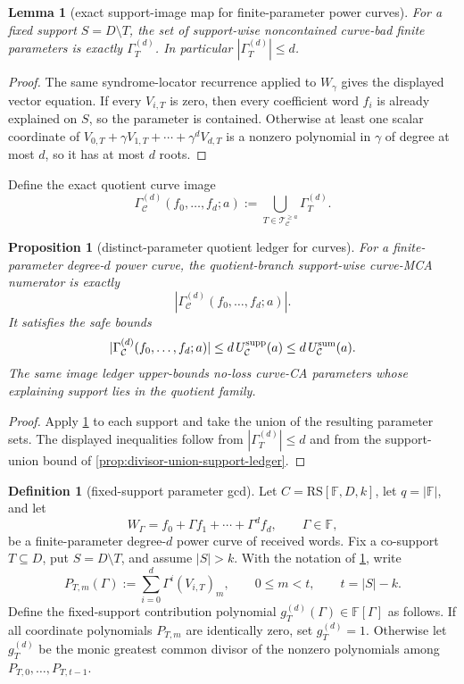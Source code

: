 \documentclass[11pt]{article}
\newtheorem{lemma}[theorem]{Lemma}
\newtheorem{proposition}[theorem]{Proposition}
\theoremstyle{definition}
\newtheorem{definition}[theorem]{Definition}
\theoremstyle{remark}
\newcommand{\F}{\mathbb{F}}
\newcommand{\RS}{\mathrm{RS}}
\begin{document}
\begin{lemma}[exact support-image map for finite-parameter power curves]
\label{lem:exact-curve-image-map}
For a fixed support $S=D\setminus T$, the set of support-wise noncontained
curve-bad finite parameters is exactly $\Gamma_T^{(d)}$.  In particular
$|\Gamma_T^{(d)}|\le d$.
\end{lemma}

\begin{proof}
The same syndrome-locator recurrence applied to $W_\gamma$ gives the displayed
vector equation.  If every $V_{i,T}$ is zero, then every coefficient word
$f_i$ is already explained on $S$, so the parameter is contained.  Otherwise at
least one scalar coordinate of
$V_{0,T}+\gamma V_{1,T}+\cdots+\gamma^dV_{d,T}$ is a nonzero polynomial in
$\gamma$ of degree at most $d$, so it has at most $d$ roots.
\end{proof}

Define the exact quotient curve image
\[
        \Gamma_{\mathcal C}^{(d)}(f_0,\ldots,f_d;a)
        :=\bigcup_{T\in\mathcal T_{\mathcal C}^{\ge a}}\Gamma_T^{(d)} .
\]

\begin{proposition}[distinct-parameter quotient ledger for curves]
\label{prop:distinct-parameter-curve-ledger}
For a finite-parameter degree-$d$ power curve, the quotient-branch support-wise
curve-MCA numerator is exactly
\[
        |\Gamma_{\mathcal C}^{(d)}(f_0,
        \ldots,f_d;a)| .
\]
It satisfies the safe bounds
\[
        |\Gamma_{\mathcal C}^{(d)}(f_0,\ldots,f_d;a)|
        \le d\,U_{\mathcal C}^{\rm supp}(a)
        \le d\,U_{\mathcal C}^{\rm sum}(a).
\]
The same image ledger upper-bounds no-loss curve-CA parameters whose explaining
support lies in the quotient family.
\end{proposition}

\begin{proof}
Apply \cref{lem:exact-curve-image-map} to each support and take the union of the
resulting parameter sets.  The displayed inequalities follow from
$|\Gamma_T^{(d)}|\le d$ and from the support-union bound of
\cref{prop:divisor-union-support-ledger}.
\end{proof}

\begin{definition}[fixed-support parameter gcd]
\label{def:fixed-support-parameter-gcd}
Let $C=\RS[\F,D,k]$, let $q=|\F|$, and let
\[
        W_\Gamma=f_0+\Gamma f_1+\cdots+\Gamma^d f_d,
        \qquad \Gamma\in\F,
\]
be a finite-parameter degree-$d$ power curve of received words.  Fix a
co-support $T\subseteq D$, put $S=D\setminus T$, and assume
$|S|>k$.  With the notation of \cref{lem:exact-curve-image-map}, write
\[
        P_{T,m}(\Gamma)
        :=\sum_{i=0}^d \Gamma^i (V_{i,T})_m,
        \qquad 0\le m<t,
        \qquad t=|S|-k .
\]
Define the fixed-support contribution polynomial
$g_T^{(d)}(\Gamma)\in\F[\Gamma]$ as follows.  If all coordinate polynomials
$P_{T,m}$ are identically zero, set $g_T^{(d)}=1$.  Otherwise let
$g_T^{(d)}$ be the monic greatest common divisor of the nonzero polynomials
among $P_{T,0},\ldots,P_{T,t-1}$.
\end{definition}
\end{document}
